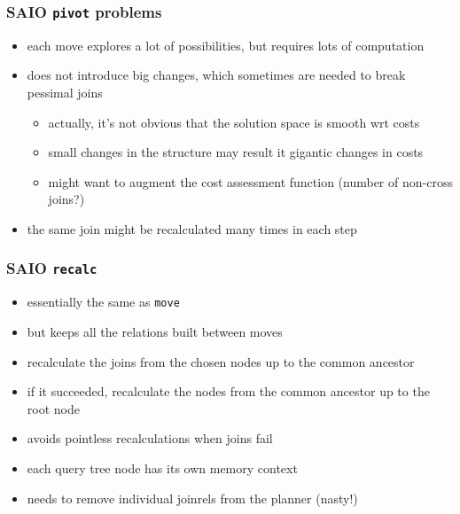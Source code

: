 \documentclass{beamer}
\begin{document}
\begin{frame}
  \frametitle{SAIO \texttt{pivot} problems}

  \begin{itemize}
  \item each move explores a lot of possibilities, but requires lots of
    computation
  \item does not introduce big changes, which sometimes are needed to break
    pessimal joins
    \begin{itemize}
    \item actually, it's not obvious that the solution space is smooth wrt
      costs
    \item small changes in the structure may result it gigantic changes in
      costs
    \item might want to augment the cost assessment function (number of
      non-cross joins?)
    \end{itemize}
  \item the same join might be recalculated many times in each step
  \end{itemize}
\end{frame}

\begin{frame}
  \frametitle{SAIO \texttt{recalc}}

  \begin{itemize}
  \item essentially the same as \texttt{move}
  \item but \alert{keeps all the relations built} between moves
  \item recalculate the joins from the chosen nodes up to the common ancestor
  \item if it succeeded, recalculate the nodes from the common ancestor up to
    the root node
  \item avoids pointless recalculations when joins fail
  \item each query tree node has its own memory context
  \item needs to remove individual joinrels from the planner (nasty!)
  \end{itemize}
\end{frame}
\end{document}
